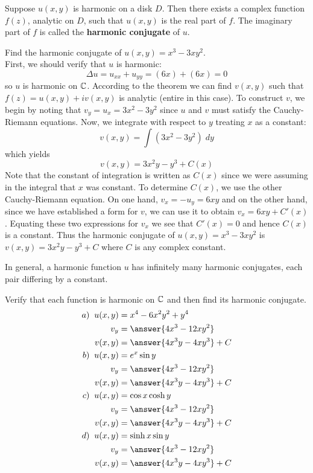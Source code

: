 \documentclass[handout]{ximera}
\begin{document}
  
\begin{theorem}
Suppose $u(x,y)$ is harmonic on a disk $D$.  Then there exists a complex function $f(z)$, analytic on $D$, 
such that $u(x,y)$ is the real part of $f$. The imaginary part of $f$ is called the {\bf harmonic conjugate} of $u$.
\end{theorem}


\begin{example}
Find the harmonic conjugate of $u(x,y) = x^3 - 3xy^2$.\\
First, we should verify that $u$ is harmonic:
\[
\Delta u = u_{xx} + u_{yy} = (6x) + (6x) = 0
\]
so $u$ is harmonic on $\mathbb C$. According to the theorem we can find $v(x,y)$ such that
$f(z) = u(x,y) + iv(x,y)$ is analytic (entire in this case). To construct $v$, we begin by noting that
$v_y = u_x = 3x^2 - 3y^2$ since $u$ and $v$ must satisfy the Cauchy-Riemann equations.
Now, we integrate with respect to $y$ treating $x$ as a constant:
\[
v(x,y) = \int \left(3x^2 -3y^2\right) \; dy
\]
which yields
\[
v(x,y) = 3x^2y - y^3 + C(x)
\]
Note that the constant of integration is written as $C(x)$ since we were assuming in 
the integral that $x$ was constant. To determine $C(x)$, we use the other Cauchy-Riemann equation. 
On one hand, $v_x = -u_y = 6xy$ and on the other hand, since we have established a form for $v$, we can use it
to obtain $v_x = 6xy + C'(x)$. Equating these two expressions for $v_x$ we see 
that $C'(x) =0$ and hence $C(x)$ is a constant. Thus the harmonic conjugate of $u(x,y) = x^3 - 3xy^2$ is
$v(x,y) = 3x^2y - y^3 + C$ where $C$ is any complex constant.
\end{example}

\begin{remark}
In general, a harmonic function $u$ has infinitely many harmonic conjugates, each pair differing by a constant.
\end{remark}

\begin{problem}
Verify that each function is harmonic on $\mathbb C$ and then find its harmonic conjugate.
\begin{align*}
a) \;\;u(x,y) &= x^4 -6x^2y^2 + y^4\\
v_y &= \answer{4x^3 - 12xy^2}\\
v(x,y) &= \answer{4x^3y - 4xy^3}+C\\
b) \;\;u(x,y) &= e^x\sin y\\
v_y &= \answer{4x^3 - 12xy^2}\\
v(x,y) &= \answer{4x^3y - 4xy^3}+C\\
c) \;\;u(x,y) &= \cos x \cosh y\\
v_y &= \answer{4x^3 - 12xy^2}\\
v(x,y) &= \answer{4x^3y - 4xy^3}+C\\
d) \;\; u(x,y) &= \sinh x \sin y\\
v_y &= \answer{4x^3 - 12xy^2}\\
v(x,y) &= \answer{4x^3y - 4xy^3}+C
\end{align*}
\end{problem}
\end{document}
